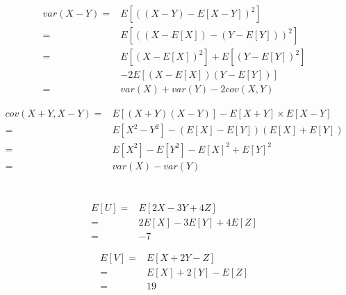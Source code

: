 \documentclass{article}
\begin{document}
        \begin{equation*}
            \begin{split}
                var(X-Y)=&E[((X-Y)-E[X-Y])^2]\\
                    =&E[((X-E[X])-(Y-E[Y]))^2]\\
                    =&E[(X-E[X])^2]+E[(Y-E[Y])^2]\\
                        &-2E[(X-E[X])(Y-E[Y])]\\
                    =&var(X)+var(Y)-2cov(X,Y)
            \end{split}
        \end{equation*}

        \begin{equation*}
            \begin{split}
                cov(X+Y,X-Y)=&E[(X+Y)(X-Y)]-E[X+Y]\times E[X-Y]\\
                    =&E[X^2-Y^2]-(E[X]-E[Y])(E[X]+E[Y])\\
                    =&E[X^2]-E[Y^2]-E[X]^2+E[Y]^2\\
                    =&var(X)-var(Y)
            \end{split}
        \end{equation*}

    \section{}
        \subsection{}
            \begin{equation*}
                \begin{split}
                    E[U]=&E[2X-3Y+4Z]\\
                        =&2E[X]-3E[Y]+4E[Z]\\
                        =&-7
                \end{split}
            \end{equation*}

            \begin{equation*}
                \begin{split}
                    E[V]=&E[X+2Y-Z]\\
                        =&E[X]+2[Y]-E[Z]\\
                        =&19
                \end{split}
            \end{equation*}
\end{document}
